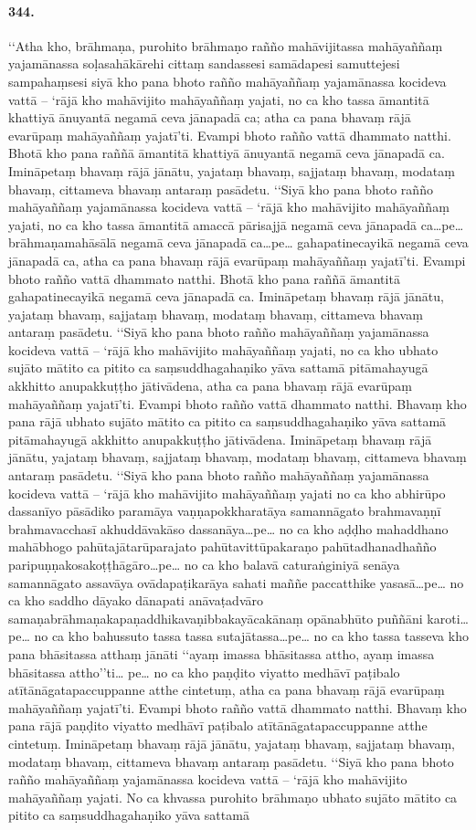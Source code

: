 \paragraph{344.} ‘‘Atha kho, brāhmaṇa, purohito brāhmaṇo rañño mahāvijitassa mahāyaññaṃ yajamānassa soḷasahākārehi cittaṃ sandassesi samādapesi samuttejesi sampahaṃsesi siyā kho pana bhoto rañño mahāyaññaṃ yajamānassa kocideva vattā – ‘rājā kho mahāvijito mahāyaññaṃ yajati, no ca kho tassa āmantitā khattiyā ānuyantā negamā ceva jānapadā ca; atha ca pana bhavaṃ rājā evarūpaṃ mahāyaññaṃ yajatī’ti. Evampi bhoto rañño vattā dhammato natthi. Bhotā kho pana raññā āmantitā khattiyā ānuyantā negamā ceva jānapadā ca. Imināpetaṃ bhavaṃ rājā jānātu, yajataṃ bhavaṃ, sajjataṃ bhavaṃ, modataṃ bhavaṃ, cittameva bhavaṃ antaraṃ pasādetu. ‘‘Siyā kho pana bhoto rañño mahāyaññaṃ yajamānassa kocideva vattā – ‘rājā kho mahāvijito mahāyaññaṃ yajati, no ca kho tassa āmantitā amaccā pārisajjā negamā ceva jānapadā ca…pe… brāhmaṇamahāsālā negamā ceva jānapadā ca…pe… gahapatinecayikā negamā ceva jānapadā ca, atha ca pana bhavaṃ rājā evarūpaṃ mahāyaññaṃ yajatī’ti. Evampi bhoto rañño vattā dhammato natthi. Bhotā kho pana raññā āmantitā gahapatinecayikā negamā ceva jānapadā ca. Imināpetaṃ bhavaṃ rājā jānātu, yajataṃ bhavaṃ, sajjataṃ bhavaṃ, modataṃ bhavaṃ, cittameva bhavaṃ antaraṃ pasādetu. ‘‘Siyā kho pana bhoto rañño mahāyaññaṃ yajamānassa kocideva vattā – ‘rājā kho mahāvijito mahāyaññaṃ yajati, no ca kho ubhato sujāto mātito ca pitito ca saṃsuddhagahaṇiko yāva sattamā pitāmahayugā akkhitto anupakkuṭṭho jātivādena, atha ca pana bhavaṃ rājā evarūpaṃ mahāyaññaṃ yajatī’ti. Evampi bhoto rañño vattā dhammato natthi. Bhavaṃ kho pana rājā ubhato sujāto mātito ca pitito ca saṃsuddhagahaṇiko yāva sattamā pitāmahayugā akkhitto anupakkuṭṭho jātivādena. Imināpetaṃ bhavaṃ rājā jānātu, yajataṃ bhavaṃ, sajjataṃ bhavaṃ, modataṃ bhavaṃ, cittameva bhavaṃ antaraṃ pasādetu. ‘‘Siyā kho pana bhoto rañño mahāyaññaṃ yajamānassa kocideva vattā – ‘rājā kho mahāvijito mahāyaññaṃ yajati no ca kho abhirūpo dassanīyo pāsādiko paramāya vaṇṇapokkharatāya samannāgato brahmavaṇṇī brahmavacchasī akhuddāvakāso dassanāya…pe… no ca kho aḍḍho mahaddhano mahābhogo pahūtajātarūparajato pahūtavittūpakaraṇo pahūtadhanadhañño paripuṇṇakosakoṭṭhāgāro…pe… no ca kho balavā caturaṅginiyā senāya samannāgato assavāya ovādapaṭikarāya sahati maññe paccatthike yasasā…pe… no ca kho saddho dāyako dānapati anāvaṭadvāro samaṇabrāhmaṇakapaṇaddhikavaṇibbakayācakānaṃ opānabhūto puññāni karoti…pe… no ca kho bahussuto tassa tassa sutajātassa…pe… no ca kho tassa tasseva kho pana bhāsitassa atthaṃ jānāti ‘‘ayaṃ imassa bhāsitassa attho, ayaṃ imassa bhāsitassa attho’’ti… pe… no ca kho paṇḍito viyatto medhāvī paṭibalo atītānāgatapaccuppanne atthe cintetuṃ, atha ca pana bhavaṃ rājā evarūpaṃ mahāyaññaṃ yajatī’ti. Evampi bhoto rañño vattā dhammato natthi. Bhavaṃ kho pana rājā paṇḍito viyatto medhāvī paṭibalo atītānāgatapaccuppanne atthe cintetuṃ. Imināpetaṃ bhavaṃ rājā jānātu, yajataṃ bhavaṃ, sajjataṃ bhavaṃ, modataṃ bhavaṃ, cittameva bhavaṃ antaraṃ pasādetu. ‘‘Siyā kho pana bhoto rañño mahāyaññaṃ yajamānassa kocideva vattā – ‘rājā kho mahāvijito mahāyaññaṃ yajati. No ca khvassa purohito brāhmaṇo ubhato sujāto mātito ca pitito ca saṃsuddhagahaṇiko yāva sattamā 